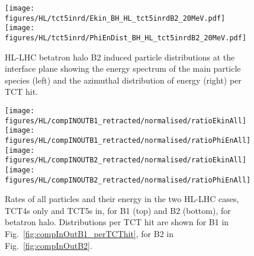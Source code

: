 \begin{figure}
\begin{center}
\texttt{[image: figures/HL/tct5inrd/Ekin\_BH\_HL\_tct5inrdB2\_20MeV.pdf]}
\texttt{[image: figures/HL/tct5inrd/PhiEnDist\_BH\_HL\_tct5inrdB2\_20MeV.pdf]}
\end{center}
\vspace{-0.6cm}
 \caption{HL-LHC betatron halo B2 induced particle distributions at the interface plane showing the energy spectrum of the main particle species (left) and the azimuthal distribution of energy (right) per TCT hit.}
  \label{tct5inrdb2retr}
\end{figure}



\begin{figure}
\centering
\texttt{[image: figures/HL/compINOUTB1\_retracted/normalised/ratioEkinAll]}
\texttt{[image: figures/HL/compINOUTB1\_retracted/normalised/ratioPhiEnAll]}
\texttt{[image: figures/HL/compINOUTB2\_retracted/normalised/ratioEkinAll]}
\texttt{[image: figures/HL/compINOUTB2\_retracted/normalised/ratioPhiEnAll]}
\caption{Rates of all particles and their energy in the two HL-LHC cases, TCT4s only and TCT5s in, for B1 (top) and B2 (bottom), for betatron halo. Distributions per TCT hit are shown for B1 in Fig.~\ref{fig:compInOutB1_perTCThit}, for B2 in Fig.~\ref{fig:compInOutB2}.
  \label{fig:compInOutB1}}
\end{figure}




